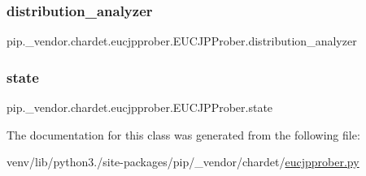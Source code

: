 \subsubsection{\texorpdfstring{distribution\+\_\+analyzer}{distribution\_analyzer}}
{\footnotesize\ttfamily pip.\+\_\+vendor.\+chardet.\+eucjpprober.\+E\+U\+C\+J\+P\+Prober.\+distribution\+\_\+analyzer}

\mbox{\label{classpip_1_1__vendor_1_1chardet_1_1eucjpprober_1_1EUCJPProber_a1f799e0eaf10a455a26015ca0363c107}} 
\subsubsection{\texorpdfstring{state}{state}}
{\footnotesize\ttfamily pip.\+\_\+vendor.\+chardet.\+eucjpprober.\+E\+U\+C\+J\+P\+Prober.\+state}



The documentation for this class was generated from the following file\+:\begin{DoxyCompactItemize}
\item 
venv/lib/python3./site-\/packages/pip/\+\_\+vendor/chardet/\hyperlink{eucjpprober_8py}{eucjpprober.\+py}\end{DoxyCompactItemize}
